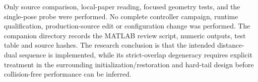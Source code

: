 \documentclass[11pt]{article}
\begin{document}
Only source comparison, local-paper reading, focused geometry tests, and the
single-pose probe were performed. No complete controller campaign, runtime
qualification, production-source edit or configuration change was performed.
The companion directory records the MATLAB review script, numeric outputs,
test table and source hashes. The research conclusion is that the intended
distance-dual sequence is implemented, while its strict-overlap degeneracy
requires explicit treatment in the surrounding initialization/restoration
and hard-tail design before collision-free performance can be inferred.
\end{document}

